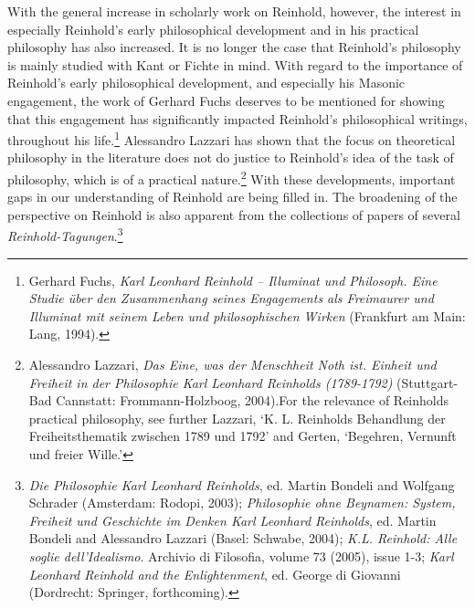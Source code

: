 With the general increase in scholarly work on Reinhold, however, the interest in especially Reinhold's early philosophical development and in his practical philosophy has also increased. It is no longer the case that Reinhold's philosophy is mainly studied with Kant or Fichte in mind. With regard to the importance of Reinhold's early philosophical development, and especially his Masonic engagement, the work of Gerhard Fuchs deserves to be mentioned for showing that this engagement has significantly impacted Reinhold's philosophical writings, throughout his life.\footnote{ Gerhard Fuchs, \textit{Karl Leonhard Reinhold {--} Illuminat und Philosoph. Eine Studie \"{u}ber den Zusammenhang seines Engagements als Freimaurer und Illuminat mit seinem Leben und philosophischen Wirken} (Frankfurt am Main: Lang, 1994).} Alessandro Lazzari has shown that the focus on theoretical philosophy in the literature does not do justice to Reinhold's idea of the task of philosophy, which is of a practical nature.\footnote{ Alessandro Lazzari, \textit{Das Eine, was der Menschheit Noth ist. Einheit und Freiheit in der Philosophie Karl Leonhard Reinholds (1789{-}1792)} (Stuttgart{-}Bad Cannstatt: Frommann{-}Holzboog, 2004).For the relevance of Reinholds practical philosophy, see further Lazzari, `K. L. Reinholds Behandlung der Freiheitsthematik zwischen 1789 und 1792' and Gerten, `Begehren, Vernunft und freier Wille.'} With these developments, important gaps in our understanding of Reinhold are being filled in. The broadening of the perspective on Reinhold is also apparent from the collections of papers of several \textit{Reinhold{-}Tagungen}.\footnote{ \textit{Die Philosophie Karl Leonhard Reinholds}, ed. Martin Bondeli and Wolfgang Schrader (Amsterdam: Rodopi, 2003); \textit{Philosophie ohne Beynamen: System, Freiheit und Geschichte im Denken Karl Leonhard Reinholds}, ed. Martin Bondeli and Alessandro Lazzari (Basel: Schwabe, 2004); \textit{K.L. Reinhold: Alle soglie dell'Idealismo}. Archivio di Filosofia, volume 73 (2005), issue 1{-}3; \textit{Karl Leonhard Reinhold and the Enlightenment}, ed. George di Giovanni (Dordrecht: Springer, forthcoming).}


